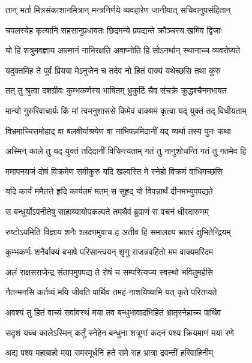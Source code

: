 \twolineshloka
{तान् भर्ता मित्रसंकाशानमित्रान् मन्त्रनिर्णये}
{व्यवहारेण जानीयात् सचिवानुपसंहितान्} %

\twolineshloka
{चपलस्येह कृत्यानि सहसानुप्रधावतः}
{छिद्रमन्ये प्रपद्यन्ते क्रौञ्चस्य खमिव द्विजाः} %

\twolineshloka
{यो हि शत्रुमवज्ञाय आत्मानं नाभिरक्षति}
{अवाप्नोति हि सोऽनर्थान् स्थानाच्च व्यवरोप्यते} %

\twolineshloka
{यदुक्तमिह ते पूर्वं प्रियया मेऽनुजेन च}
{तदेव नो हितं वाक्यं यथेच्छसि तथा कुरु} %

\twolineshloka
{तत् तु श्रुत्वा दशग्रीवः कुम्भकर्णस्य भाषितम्}
{भ्रुकुटिं चैव संचक्रे क्रुद्धश्चैनमभाषत} %

\twolineshloka
{मान्यो गुरुरिवाचार्यः किं मां त्वमनुशाससे}
{किमेवं वाक्श्रमं कृत्वा यद् युक्तं तद् विधीयताम्} %

\twolineshloka
{विभ्रमाच्चित्तमोहाद् वा बलवीर्याश्रयेण वा}
{नाभिपन्नमिदानीं यद् व्यर्था तस्य पुनः कथा} %

\twolineshloka
{अस्मिन् काले तु यद् युक्तं तदिदानीं विचिन्त्यताम्}
{गतं तु नानुशोचन्ति गतं तु गतमेव हि} %

\twolineshloka
{ममापनयजं दोषं विक्रमेण समीकुरु}
{यदि खल्वस्ति मे स्नेहो विक्रमं वाधिगच्छसि} %

\twolineshloka
{यदि कार्यं ममैतत्ते हृदि कार्यतमं मतम्}
{स सुहृद् यो विपन्नार्थं दीनमभ्युपपद्यते} %

\twolineshloka
{स बन्धुर्योऽपनीतेषु साहाय्यायोपकल्पते}
{तमथैवं ब्रुवाणं स वचनं धीरदारुणम्} %

\twolineshloka
{रुष्टोऽयमिति विज्ञाय शनैः श्लक्ष्णमुवाच ह}
{अतीव हि समालक्ष्य भ्रातरं क्षुभितेन्द्रियम्} %

\twolineshloka
{कुम्भकर्णः शनैर्वाक्यं बभाषे परिसान्त्वयन्}
{शृणु राजन्नवहितो मम वाक्यमरिंदम} %

\twolineshloka
{अलं राक्षसराजेन्द्र संतापमुपपद्य ते}
{रोषं च सम्परित्यज्य स्वस्थो भवितुमर्हसि} %

\twolineshloka
{नैतन्मनसि कर्तव्यं मयि जीवति पार्थिव}
{तमहं नाशयिष्यामि यत् कृते परितप्यते} %

\twolineshloka
{अवश्यं तु हितं वाच्यं सर्वावस्थं मया तव}
{बन्धुभावादभिहितं भ्रातृस्नेहाच्च पार्थिव} %

\twolineshloka
{सदृशं यच्च कालेऽस्मिन् कर्तुं स्नेहेन बन्धुना}
{शत्रूणां कदनं पश्य क्रियमाणं मया रणे} %

\twolineshloka
{अद्य पश्य महाबाहो मया समरमूर्धनि}
{हते रामे सह भ्रात्रा द्रवन्तीं हरिवाहिनीम्} %

